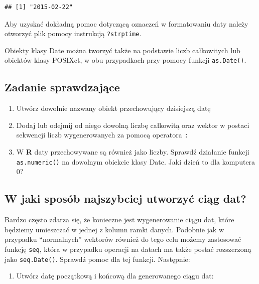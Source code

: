 \documentclass[]{book}
\providecommand{\tightlist}{%
  \setlength{\itemsep}{0pt}\setlength{\parskip}{0pt}}
\theoremstyle{definition}
\theoremstyle{definition}
\theoremstyle{definition}
\theoremstyle{remark}
\begin{document}
\begin{verbatim}
## [1] "2015-02-22"
\end{verbatim}

Aby uzyskać dokładną pomoc dotyczącą oznaczeń w formatowaniu daty należy
otworzyć plik pomocy instrukcją \texttt{?strptime}.

Obiekty klasy Date można tworzyć także na podstawie liczb całkowitych
lub obiektów klasy POSIXct, w obu przypadkach przy pomocy funkcji
\texttt{as.Date()}.

\subsection*{Zadanie sprawdzające}\label{zadanie-sprawdzajace-2}

\begin{enumerate}
\def\labelenumi{\arabic{enumi}.}
\tightlist
\item
  Utwórz dowolnie nazwany obiekt przechowujący dzisiejszą datę
\item
  Dodaj lub odejmij od niego dowolną liczbę całkowitą oraz wektor w
  postaci sekwencji liczb wygenerowanych za pomocą operatora \texttt{:}
\item
  W \textbf{R} daty przechowywane są również jako liczby. Sprawdź
  działanie funkcji \texttt{as.numeric()} na dowolnym obiekcie klasy
  Date. Jaki dzień to dla komputera 0?
\end{enumerate}

\subsection{W jaki sposób najszybciej utworzyć ciąg
dat?}\label{w-jaki-sposob-najszybciej-utworzyc-ciag-dat}

Bardzo często zdarza się, że konieczne jest wygenerowanie ciągu dat,
które będziemy umieszczać w jednej z kolumn ramki danych. Podobnie jak w
przypadku ``normalnych'' wektorów również do tego celu możemy zastosować
funkcję \texttt{seq}, która w przypadku operacji na datach ma także
postać rozszerzoną jako \texttt{seq.Date()}. Sprawdź pomoc dla tej
funkcji. Następnie:

\begin{enumerate}
\def\labelenumi{\arabic{enumi}.}
\tightlist
\item
  Utwórz datę początkową i końcową dla generowanego ciągu dat:
\end{enumerate}
\end{document}
